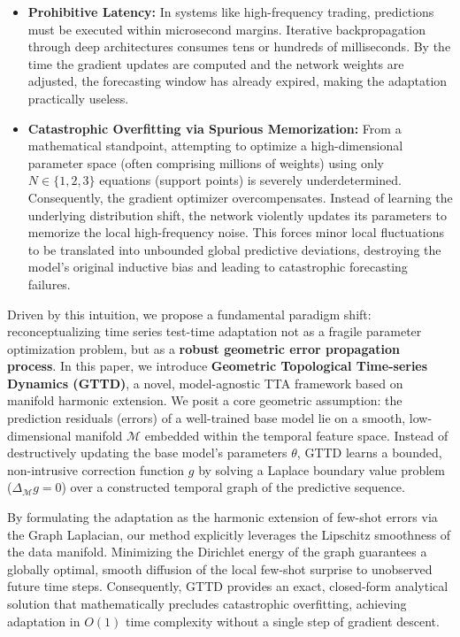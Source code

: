 \documentclass{article}
\begin{document}
	\begin{itemize}
		\item \textbf{Prohibitive Latency:} In systems like high-frequency trading, predictions must be executed within microsecond margins. Iterative backpropagation through deep architectures consumes tens or hundreds of milliseconds\cite{karmanov2024efficient, jia2024tinytta}. By the time the gradient updates are computed and the network weights are adjusted, the forecasting window has already expired, making the adaptation practically useless.
		\item \textbf{Catastrophic Overfitting via Spurious Memorization:} From a mathematical standpoint, attempting to optimize a high-dimensional parameter space (often comprising millions of weights) using only $N \in \{1, 2, 3\}$ equations (support points) is severely underdetermined. Consequently, the gradient optimizer overcompensates. Instead of learning the underlying distribution shift, the network violently updates its parameters to memorize the local high-frequency noise. This forces minor local fluctuations to be translated into unbounded global predictive deviations, destroying the model's original inductive bias and leading to catastrophic forecasting failures.
	\end{itemize}
	
	Driven by this intuition, we propose a fundamental paradigm shift: reconceptualizing time series test-time adaptation not as a fragile parameter optimization problem, but as a \textbf{robust geometric error propagation process}. In this paper, we introduce \textbf{Geometric Topological Time-series Dynamics (GTTD)}, a novel, model-agnostic TTA framework based on manifold harmonic extension\cite{zhu2003semi, zhou2003learning}. We posit a core geometric assumption: the prediction residuals (errors) of a well-trained base model lie on a smooth, low-dimensional manifold $\mathcal{M}$ embedded within the temporal feature space. Instead of destructively updating the base model's parameters $\theta$, GTTD learns a bounded, non-intrusive correction function $g$ by solving a Laplace boundary value problem\cite{zhou2003learning, calder2020poisson} ($\Delta_{\mathcal{M}} g = 0$) over a constructed temporal graph of the predictive sequence.
	
	By formulating the adaptation as the harmonic extension of few-shot errors via the Graph Laplacian\cite{zhu2003semi, zhou2003learning, calder2020poisson}, our method explicitly leverages the Lipschitz smoothness of the data manifold. Minimizing the Dirichlet energy of the graph guarantees a globally optimal, smooth diffusion of the local few-shot surprise to unobserved future time steps\cite{zhu2003semi, zhou2003learning}. Consequently, GTTD provides an exact, closed-form analytical solution that mathematically precludes catastrophic overfitting, achieving adaptation in $O(1)$ time complexity without a single step of gradient descent.
	
\end{document}
